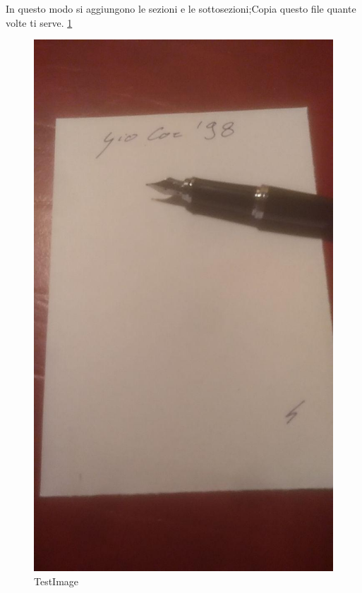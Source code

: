 {}

In questo modo si aggiungono le sezioni e le sottosezioni;Copia questo file quante volte ti serve.
\ref{img1}

\begin{figure}[!ht]
\includegraphics[width=1\textwidth]{./../img/Images/myLogo}
\caption{TestImage}
\label{img1}
\end{figure}

\cite{repo}
